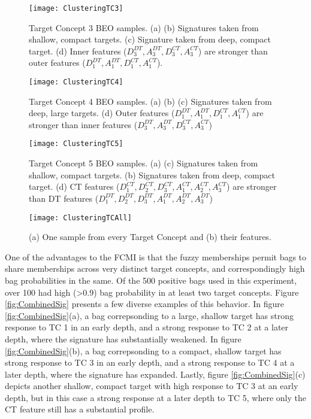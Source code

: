 \documentclass[12pt,dvips]{report}
\numberwithin{equation}{section}
\begin{document}
\begin{figure}[htb]\texttt{[image: ClusteringTC3]}
\caption{Target Concept 3 BEO samples. (a) (b) Signatures taken from shallow, compact targets.  (c) Signature taken from deep, compact target. (d) Inner features ($D^{DT}_3, A^{DT}_3, D^{CT}_3, A^{CT}_3$) are stronger than outer features ($D^{DT}_1, A^{DT}_1, D^{CT}_1, A^{CT}_1$).}
\label{fig:ClusteringTC3}


\end{figure}

\begin{figure}[htb]\texttt{[image: ClusteringTC4]}
\caption{Target Concept 4 BEO samples. (a) (b) (c) Signatures taken from deep, large targets. (d) Outer features ($D^{DT}_1, A^{DT}_1, D^{CT}_1, A^{CT}_1$) are stronger than inner features ($D^{DT}_3, A^{DT}_3, D^{CT}_3, A^{CT}_3$)}
\label{fig:ClusteringTC4}


\end{figure}

\begin{figure}[htb]\texttt{[image: ClusteringTC5]}
\caption{Target Concept 5 BEO samples. (a) (c) Signatures taken from shallow, compact targets. (b) Signatures taken from deep, compact target. (d) CT features ($D^{CT}_1, D^{CT}_2, D^{CT}_3, A^{CT}_1, A^{CT}_2, A^{CT}_3$) are stronger than DT features ($D^{DT}_1, D^{DT}_2, D^{DT}_3, A^{DT}_1, A^{DT}_2, A^{DT}_3$)}
\label{fig:ClusteringTC5}


\end{figure}

\begin{figure}[htb]\texttt{[image: ClusteringTCAll]}
\caption{(a) One sample from every Target Concept and (b) their features.}
\label{fig:ClusteringTCAll}


\end{figure}


One of the advantages to the FCMI is that the fuzzy memberships permit bags to share memberships across very distinct target concepts, and correspondingly high bag probabilities in the same.  Of the 500 positive bags used in this experiment, over 100 had high (\textgreater 0.9) bag probability in at least two target concepts.  Figure \ref{fig:CombinedSig} presents a few diverse examples of this behavior.  In figure \ref{fig:CombinedSig}(a), a bag correpsonding to a large, shallow target has strong response to TC 1 in an early depth, and a strong response to TC 2 at a later depth, where the signature has substantially weakened.  In figure \ref{fig:CombinedSig}(b), a bag correpsonding to a compact, shallow target has strong response to TC 3 in an early depth, and a strong response to TC 4 at a later depth, where the signature has expanded.  Lastly, figure \ref{fig:CombinedSig}(c) depicts another shallow, compact target with high response to TC 3 at an early depth, but in this case a strong response at a later depth to TC 5, where only the CT feature still has a substantial profile.
\end{document}
